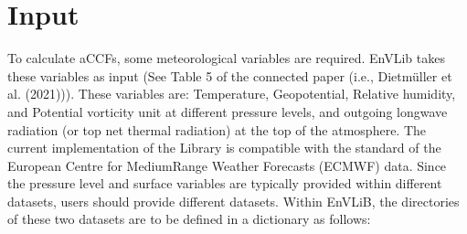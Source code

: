 \documentclass[a4paper,11pt,english]{sphinxmanual}
\begin{document}
\begin{sphinxVerbatim}[commandchars=\\\{\}]
\PYG{p}{[}\PYG{p}{]}                     

\PYG{p}{[}\PYG{p}{]}                    
\end{sphinxVerbatim}


\section{Input}
\label{\detokenize{gStarted:input}}
To calculate aCCFs, some meteorological variables are required. EnVLib takes these variables as input (See Table 5 of the connected paper (i.e., Dietmüller et al. (2021))).
These variables are: Temperature, Geopotential, Relative humidity, and Potential vorticity unit at different pressure levels,
and outgoing longwave radiation (or top net thermal radiation) at the top of the atmosphere.
The current implementation of the Library is compatible with the standard of the European Centre for Medium\sphinxhyphen{}Range Weather Forecasts (ECMWF) data.
Since the pressure level and surface variables are typically provided within different datasets, users should provide different datasets.
Within EnVLiB, the directories of these two datasets are to be defined in a dictionary as follows:

\begin{sphinxVerbatim}[commandchars=\\\{\}]
  
\PYG{p}{[}\PYG{p}{]}     
\PYG{p}{[}\PYG{p}{]}     
\end{sphinxVerbatim}
\end{document}
